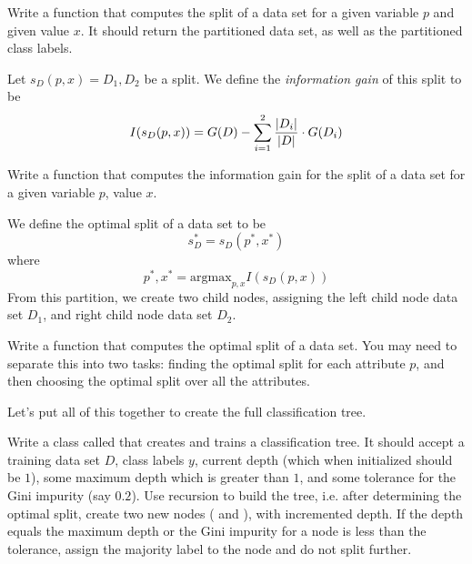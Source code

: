 \begin{problem}
Write a function that computes the split of a data set for a given variable $p$ and given value $x$. It should return the partitioned data set, as well as the partitioned class labels.
\end{problem}

\begin{definition}
Let $s_{D}(p,x) = D_{1},D_{2}$ be a split. We define the \emph{information gain} of this split to be 
\begin{equation*}
I(s_{D}(p,x)) = G(D) - \sum_{i=1}^{2} \frac{\left\lvert D_{i}\right\rvert}{\left\lvert D\right\rvert} \cdot G(D_{i})
\end{equation*}
\end{definition}

\begin{problem}
Write a function that computes the information gain for the split of a data set for a given variable $p$, value $x$.
\end{problem}

We define the optimal split of a data set to be
\begin{equation*}
s_{D}^{*} = s_{D}(p^{*}, x^{*})
\end{equation*}
where 
\begin{equation*}
p^{*}, x^{*} = \text{argmax}_{p,x} I(s_{D}(p,x))
\end{equation*}
From this partition, we create two child nodes, assigning the left child node data set $D_{1}$, and right child node data set $D_{2}$.

\begin{problem}
Write a function that computes the optimal split of a data set. You may need to separate this into two tasks: finding the optimal split for each attribute $p$, and then choosing the optimal split over all the attributes.
\end{problem}

Let's put all of this together to create the full classification tree.

\begin{problem}
Write a class called  that creates and trains a classification tree. It should accept a training data set $D$, class labels $y$, current depth (which when initialized should be $1$), some maximum depth which is greater than $1$, and some tolerance for the Gini impurity (say $0.2$). Use recursion to build the tree, i.e. after determining the optimal split, create two new nodes ( and ), with incremented depth. If the depth equals the maximum depth or the Gini impurity for a node is less than the tolerance, assign the majority label to the node and do not split further.
\end{problem}

